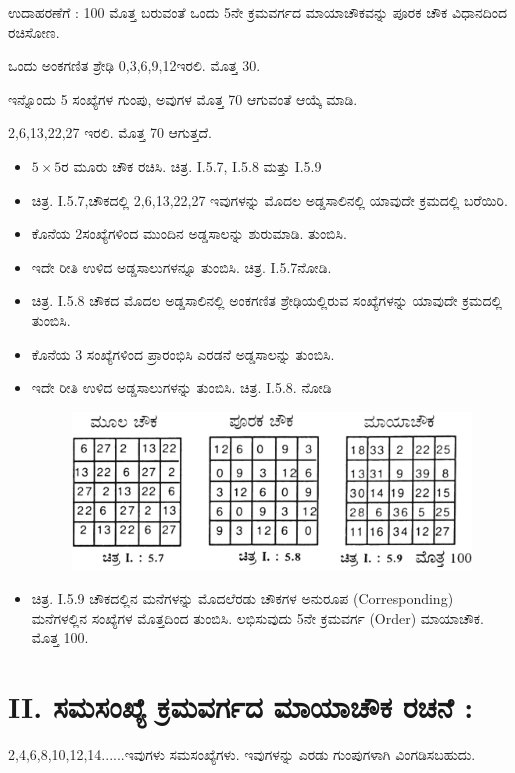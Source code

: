 ಉದಾಹರಣೆಗೆ : 100 ಮೊತ್ತ ಬರುವಂತೆ ಒಂದು 5ನೇ ಕ್ರಮವರ್ಗದ ಮಾಯಾಚೌಕ\-ವನ್ನು ಪೂರಕ ಚೌಕ ವಿಧಾನದಿಂದ ರಚಿಸೋಣ.

ಒಂದು ಅಂಕಗಣಿತ ಶ್ರೇಢಿ 0,3,6,9,12ಇರಲಿ. ಮೊತ್ತ 30.

ಇನ್ನೊಂದು 5 ಸಂಖ್ಯೆಗಳ ಗುಂಪು, ಅವುಗಳ ಮೊತ್ತ 70 ಆಗುವಂತೆ ಆಯ್ಕೆ ಮಾಡಿ.

2,6,13,22,27 ಇರಲಿ. ಮೊತ್ತ 70 ಆಗುತ್ತದೆ.
\begin{itemize}
	\item $5 \times 5$ರ ಮೂರು ಚೌಕ ರಚಿಸಿ. ಚಿತ್ರ. I.5.7, I.5.8 ಮತ್ತು I.5.9
	\item ಚಿತ್ರ. I.5.7,ಚೌಕದಲ್ಲಿ 2,6,13,22,27 ಇವುಗಳನ್ನು ಮೊದಲ ಅಡ್ಡಸಾಲಿನಲ್ಲಿ \hbox{ಯಾವುದೇ} ಕ್ರಮದಲ್ಲಿ ಬರೆಯಿರಿ.
	\item ಕೊನೆಯ 2ಸಂಖ್ಯೆಗಳಿಂದ ಮುಂದಿನ ಅಡ್ಡಸಾಲನ್ನು ಶುರುಮಾಡಿ. ತುಂಬಿಸಿ.
	\item ಇದೇ ರೀತಿ ಉಳಿದ ಅಡ್ಡಸಾಲುಗಳನ್ನೂ ತುಂಬಿಸಿ. ಚಿತ್ರ. I.5.7ನೋಡಿ.
	\item ಚಿತ್ರ. I.5.8 ಚೌಕದ ಮೊದಲ ಅಡ್ಡಸಾಲಿನಲ್ಲಿ ಅಂಕಗಣಿತ ಶ್ರೇಢಿಯಲ್ಲಿರುವ ಸಂಖ್ಯೆಗಳನ್ನು ಯಾವುದೇ ಕ್ರಮದಲ್ಲಿ ತುಂಬಿಸಿ.
	\item ಕೊನೆಯ 3 ಸಂಖ್ಯೆಗಳಿಂದ ಪ್ರಾರಂಭಿಸಿ ಎರಡನೆ ಅಡ್ಡಸಾಲನ್ನು ತುಂಬಿಸಿ.
	\item ಇದೇ ರೀತಿ ಉಳಿದ ಅಡ್ಡಸಾಲುಗಳನ್ನು ತುಂಬಿಸಿ. ಚಿತ್ರ. I.5.8. ನೋಡಿ
	\begin{figure}[H]
	\includegraphics{src/figures/chap3/fig3-13.jpg}
	\end{figure}
	\item ಚಿತ್ರ. I.5.9 ಚೌಕದಲ್ಲಿನ ಮನೆಗಳನ್ನು ಮೊದಲೆರಡು ಚೌಕಗಳ ಅನುರೂಪ (Corresponding) ಮನೆಗಳಲ್ಲಿನ ಸಂಖ್ಯೆಗಳ ಮೊತ್ತದಿಂದ ತುಂಬಿಸಿ. \hbox{ಲಭಿಸುವುದು} 5ನೇ ಕ್ರಮವರ್ಗ (Order) ಮಾಯಾಚೌಕ. ಮೊತ್ತ 100.
\end{itemize}

\section*{II. ಸಮಸಂಖ್ಯೆ ಕ್ರಮವರ್ಗದ ಮಾಯಾಚೌಕ ರಚನೆ :}

2,4,6,8,10,12,14......ಇವುಗಳು ಸಮಸಂಖ್ಯೆಗಳು. ಇವುಗಳನ್ನು ಎರಡು ಗುಂಪುಗಳಾಗಿ ವಿಂಗಡಿಸಬಹುದು.

